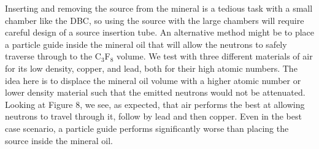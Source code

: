 \documentclass[%
12pt,
twoside,
reprint,
amsmath,amssymb,
aps,
]{article}
\begin{document}
	\par Inserting and removing the source from the mineral is a tedious task with a small chamber like the DBC, so using the source with the large chambers will require careful design of a source insertion tube. An alternative method might be to place a particle guide inside the mineral oil that will allow the neutrons to safely traverse through to the C$_{3}$F$_{8}$ volume. We test with three different materials of air for its low density, copper, and lead, both for their high atomic numbers. The idea here is to displace the mineral oil volume with a higher atomic number or lower density material such that the emitted neutrons would not be attenuated. Looking at Figure 8, we see, as expected, that air performs the best at allowing neutrons to travel through it, follow by lead and then copper. Even in the best case scenario, a particle guide performs significantly worse than placing the source inside the mineral oil.
\end{document}
